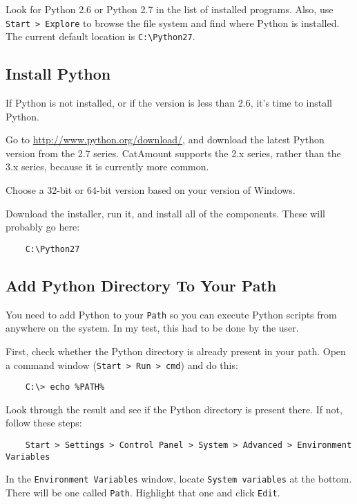 Look for Python 2.6 or Python 2.7 in the list of installed programs.
Also, use \verb=Start > Explore= to browse the file system and find
where Python is installed. The current default location is
\verb=C:\Python27=.


\subsection{Install Python}

If Python is not installed, or if the version is less than 2.6,
it's time to install Python.

Go to \url{http://www.python.org/download/}, and download the latest
Python version from the 2.7 series. CatAmount supports the 2.x series,
rather than the 3.x series, because it is currently more common.

Choose a 32-bit or 64-bit version based on your version of Windows.

Download the installer, run it, and install all of the components.
These will probably go here:

\begin{verbatim}
    C:\Python27
\end{verbatim}


\subsection{Add Python Directory To Your Path}

You need to add Python to your \verb=Path= so you can execute Python scripts
from anywhere on the system. In my test, this had to be done by the user.

First, check whether the Python directory is already present in your
path. Open a command window (\verb=Start > Run > cmd=) and do this:

\begin{verbatim}
    C:\> echo %PATH%
\end{verbatim}

Look through the result and see if the Python directory is present
there. If not, follow these steps:

\begin{verbatim}
    Start > Settings > Control Panel > System > Advanced > Environment Variables
\end{verbatim}

In the \verb=Environment Variables= window, locate \verb=System variables= at the
bottom. There will be one called \verb=Path=. Highlight that one and
click \verb=Edit=.

